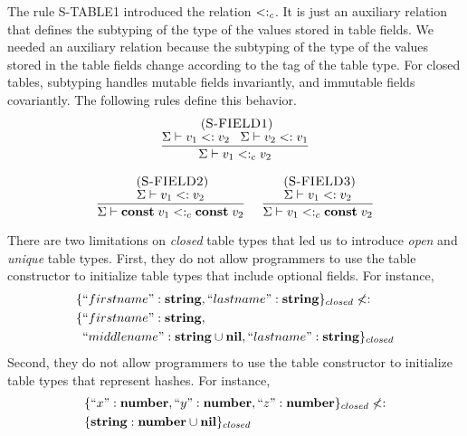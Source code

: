 The rule \textsc{S-TABLE1} introduced the relation $<:_{c}$.
It is just an auxiliary relation that defines the subtyping of the
type of the values stored in table fields.
We needed an auxiliary relation because the subtyping of the type
of the values stored in the table fields change according to the
tag of the table type.
For closed tables, subtyping handles mutable fields invariantly,
and immutable fields covariantly.
The following rules define this behavior.
\[
\begin{array}{c}
\begin{array}{c}
\; (\textsc{S-FIELD1})\\
\dfrac{\Sigma \vdash v_{1} <: v_{2} \;\;\;
       \Sigma \vdash v_{2} <: v_{1}}
      {\Sigma \vdash v_{1} <:_{c} v_{2}}
\end{array}
\\ \\
\begin{array}{c}
\; (\textsc{S-FIELD2})\\
\dfrac{\Sigma \vdash v_{1} <: v_{2}}
      {\Sigma \vdash \mathbf{const} \; v_{1} <:_{c} \mathbf{const} \; v_{2}}
\end{array}
\;
\begin{array}{c}
\; (\textsc{S-FIELD3})\\
\dfrac{\Sigma \vdash v_{1} <: v_{2}}
      {\Sigma \vdash v_{1} <:_{c} \mathbf{const} \; v_{2}}
\end{array}
\end{array}
\]

There are two limitations on \emph{closed} table types that led us to
introduce \emph{open} and \emph{unique} table types.
First, they do not allow programmers to use the table constructor to
initialize table types that include optional fields.
For instance,
\begin{align*}
\{ & ``firstname":\mathbf{string}, ``lastname":\mathbf{string} \}_{closed} \not <:\\
\{ & ``firstname":\mathbf{string},\\
  &  ``middlename":\mathbf{string} \cup \mathbf{nil}, ``lastname":\mathbf{string} \}_{closed}
\end{align*}
Second, they do not allow programmers to use the table constructor to
initialize table types that represent hashes.
For instance,
\begin{align*}
\{ & ``x":\mathbf{number}, ``y":\mathbf{number}, ``z":\mathbf{number} \}_{closed} \not <:\\
\{ & \mathbf{string}:\mathbf{number} \cup \mathbf{nil}\}_{closed}
\end{align*}

